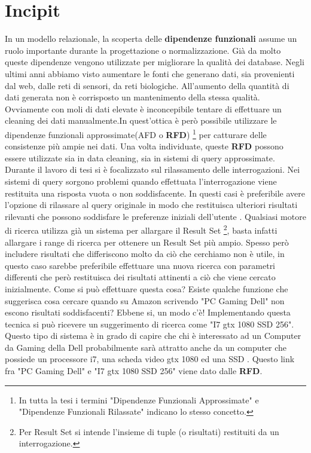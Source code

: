 \section{Incipit}

In un modello relazionale, la scoperta delle \textbf{dipendenze funzionali} assume un ruolo importante durante la progettazione o normalizzazione. Già da molto queste dipendenze vengono utilizzate per migliorare la qualità dei database.
Negli ultimi anni abbiamo visto aumentare le fonti che generano dati, sia provenienti dal web, dalle reti di sensori, da reti biologiche. All’aumento della quantità di dati generata non è corrisposto un mantenimento della stessa qualità. Ovviamente con moli di dati elevate è inconcepibile tentare di effettuare un cleaning dei dati manualmente.In quest’ottica è però possibile utilizzare le dipendenze funzionali approssimate(AFD o \textbf{RFD}) \footnote{In tutta la tesi i termini "Dipendenze Funzionali Approssimate" e "Dipendenze Funzionali Rilassate" indicano lo stesso concetto.} per catturare delle consistenze più ampie nei dati.
Una volta individuate, queste \textbf{RFD} possono essere utilizzate sia in data cleaning, sia in sistemi di query approssimate. Durante il lavoro di tesi si è focalizzato sul rilassamento delle interrogazioni. Nei sistemi di query sorgono problemi quando effettuata l'interrogazione viene restituita una risposta vuota o non soddisfacente. In questi casi è preferibile avere l'opzione di rilassare al query originale in modo che restituisca ulteriori risultati rilevanti che possono soddisfare le preferenze iniziali dell'utente . Qualsiasi motore di ricerca utilizza già un sistema per allargare il Result Set \footnote{Per Result Set si intende l'insieme di tuple (o risultati) restituiti da un interrogazione.}, basta infatti allargare i range di ricerca per ottenere un Result Set più ampio. Spesso però includere risultati che differiscono molto da ciò che cerchiamo non è utile, in questo caso sarebbe preferibile effettuare una nuova ricerca con parametri differenti che però restituisca dei risultati attinenti a ciò che viene cercato inizialmente. Come si può effettuare questa cosa? Esiste qualche funzione che suggerisca cosa cercare quando su Amazon scrivendo "PC Gaming Dell" non escono risultati soddisfacenti? Ebbene si, un modo c'è! Implementando questa tecnica si può ricevere un suggerimento di ricerca come "I7 gtx 1080 SSD 256". Questo tipo di sistema è in grado di capire che chi è interessato ad un Computer da Gaming della Dell probabilmente sarà attratto anche da un computer che possiede un processore i7, una scheda video gtx 1080 ed una SSD .
Questo link fra "PC Gaming Dell" e "I7 gtx 1080 SSD 256" viene dato dalle \textbf{RFD}.


